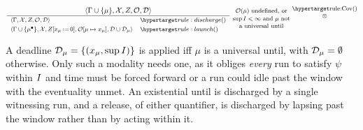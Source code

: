 \vspace{-0.3cm}
\[
\footnotesize
\frac{\tup{\Gamma\cup\{\mu\}}{\Ctx}{Z}{\obligations}{\Deadline}}
{\begin{array}{ll}
\tup{\Gamma}{\Ctx}{Z}{\obligations}{\Deadline} & \ruleanchor{discharge}\\[3pt]
\tup{\Gamma\cup\{\mu^\bullet\}}{\Ctx}{\rst{Z}{x_\mu}}{\obligations[\mu\mapsto x_\mu]}{\Deadline\cup \Deadline_\mu}
 & \ruleanchor{launch}
\end{array}}
\raisebox{-4ex}{
  \shortstack{
    $\obligations(\mu)$ undefined, or\\
    $\sup\kI<\infty$ and $\mu$ not\\
    a universal until}
}
\shortstack{\ruleanchor{Cov}\\\ANDn}
\]


%
A deadline $\mathcal{D}_\mu=\{(x_\mu,\sup I)\}$ is applied iff $\mu$ is a universal until, with
$\mathcal{D}_\mu=\emptyset$ otherwise. Only such a modality needs one, as it obliges \emph{every} run to
satisfy $\psi$ within $I$ and time must be forced forward or a run could idle past the window with
the eventuality unmet. An existential until is discharged by a single witnessing run, and a release,
of either quantifier, is discharged by lapsing past the window rather than by acting within it.

%
%

%


